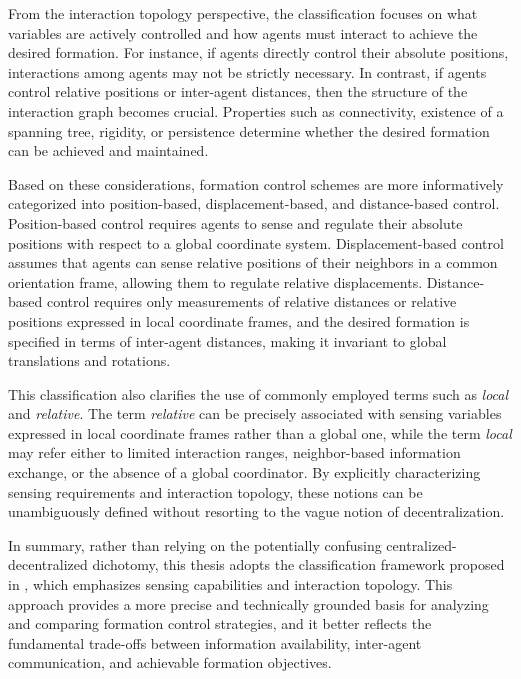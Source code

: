 From the interaction topology perspective, the classification focuses on what variables are actively controlled and how agents must interact to achieve the desired formation. For instance, if agents directly control their absolute positions, interactions among agents may not be strictly necessary. In contrast, if agents control relative positions or inter-agent distances, then the structure of the interaction graph becomes crucial. Properties such as connectivity, existence of a spanning tree, rigidity, or persistence determine whether the desired formation can be achieved and maintained.

Based on these considerations, formation control schemes are more informatively categorized into position-based, displacement-based, and distance-based control. Position-based control requires agents to sense and regulate their absolute positions with respect to a global coordinate system. Displacement-based control assumes that agents can sense relative positions of their neighbors in a common orientation frame, allowing them to regulate relative displacements. Distance-based control requires only measurements of relative distances or relative positions expressed in local coordinate frames, and the desired formation is specified in terms of inter-agent distances, making it invariant to global translations and rotations.

This classification also clarifies the use of commonly employed terms such as \emph{local} and \emph{relative}. The term \emph{relative} can be precisely associated with sensing variables expressed in local coordinate frames rather than a global one, while the term \emph{local} may refer either to limited interaction ranges, neighbor-based information exchange, or the absence of a global coordinator. By explicitly characterizing sensing requirements and interaction topology, these notions can be unambiguously defined without resorting to the vague notion of decentralization.

In summary, rather than relying on the potentially confusing centralized-decentralized dichotomy, this thesis adopts the classification framework proposed in \cite{surver_centralized_decentralized}, which emphasizes sensing capabilities and interaction topology. This approach provides a more precise and technically grounded basis for analyzing and comparing formation control strategies, and it better reflects the fundamental trade-offs between information availability, inter-agent communication, and achievable formation objectives.

